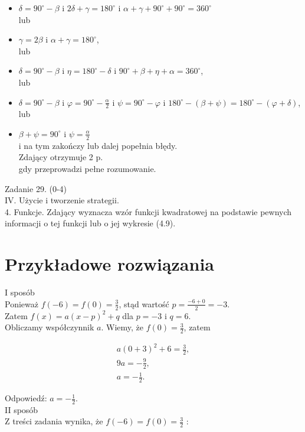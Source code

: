 \documentclass[10pt]{article}
\begin{document}
\begin{itemize}
  \item $\delta=90^{\circ}-\beta$ i $2 \delta+\gamma=180^{\circ}$ i $\alpha+\gamma+90^{\circ}+90^{\circ}=360^{\circ}$\\
lub
  \item $\gamma=2 \beta$ i $\alpha+\gamma=180^{\circ}$,\\
lub
  \item $\delta=90^{\circ}-\beta$ i $\eta=180^{\circ}-\delta$ i $90^{\circ}+\beta+\eta+\alpha=360^{\circ}$,\\
lub
  \item $\delta=90^{\circ}-\beta$ i $\varphi=90^{\circ}-\frac{\alpha}{2}$ i $\psi=90^{\circ}-\varphi$ i $180^{\circ}-(\beta+\psi)=180^{\circ}-(\varphi+\delta)$,\\
lub
  \item $\beta+\psi=90^{\circ}$ i $\psi=\frac{\alpha}{2}$\\
i na tym zakończy lub dalej popełnia błędy.\\
Zdający otrzymuje 2 p.\\
gdy przeprowadzi pełne rozumowanie.
\end{itemize}

Zadanie 29. (0-4)\\
IV. Użycie i tworzenie strategii.\\
4. Funkcje. Zdający wyznacza wzór funkcji kwadratowej na podstawie pewnych informacji o tej funkcji lub o jej wykresie (4.9).

\section*{Przykładowe rozwiązania}
I sposób\\
Ponieważ $f(-6)=f(0)=\frac{3}{2}$, stąd wartość $p=\frac{-6+0}{2}=-3$.\\
Zatem $f(x)=a(x-p)^{2}+q$ dla $p=-3$ i $q=6$.\\
Obliczamy współczynnik $a$. Wiemy, że $f(0)=\frac{3}{2}$, zatem

$$
\begin{gathered}
a(0+3)^{2}+6=\frac{3}{2}, \\
9 a=-\frac{9}{2}, \\
a=-\frac{1}{2} .
\end{gathered}
$$

Odpowiedź: $a=-\frac{1}{2}$.\\
II sposób\\
Z treści zadania wynika, że $f(-6)=f(0)=\frac{3}{2}$ :
\end{document}
